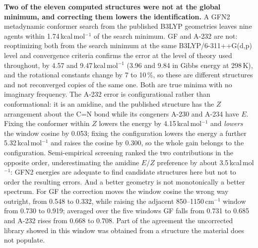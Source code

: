 \documentclass[review,12pt]{elsarticle}
\newcommand*\wn{\ensuremath{\text{cm}^{-1}}}
\begin{document}
\textbf{Two of the eleven computed structures were not at the global minimum, and
correcting them lowers the identification.} A GFN2 metadynamic conformer search from the
published B3LYP geometries leaves nine agents within 1.74\,kcal\,mol$^{-1}$ of the search
minimum. GF and A-232 are not: reoptimizing both from the search minimum at the same
B3LYP/6-311++G(d,p) level and convergence criteria confirms the error at the level of
theory used throughout, by 4.57 and 9.47\,kcal\,mol$^{-1}$ (3.96 and 9.84 in Gibbs energy at 298\,K), and the rotational constants
change by 7 to 10\,\%, so these are different structures and not reconverged copies of the
same one. Both are true minima with no imaginary frequency. The A-232 error is
configurational rather than conformational: it is an amidine, and the published structure
has the $Z$ arrangement about the C=N bond while its congeners A-230 and A-234 have $E$.
Fixing the conformer within $Z$ lowers the energy by 4.15\,kcal\,mol$^{-1}$ and
\emph{lowers} the window cosine by 0.053; fixing the configuration lowers the energy a
further 5.32\,kcal\,mol$^{-1}$ and raises the cosine by 0.300, so the whole gain belongs to
the configuration. Semi-empirical screening ranked the two contributions in the opposite
order, underestimating the amidine $E/Z$ preference by about 3.5\,kcal\,mol$^{-1}$: GFN2
energies are adequate to find candidate structures here but not to order the resulting
errors. And a better geometry is not monotonically a better spectrum. For GF the correction
moves the window cosine the wrong way outright, from 0.548 to 0.332, while raising the
adjacent 850--1150\,\wn{} window from 0.730 to 0.919; averaged over the five windows GF
falls from 0.731 to 0.685 and A-232 rises from 0.668 to 0.708. Part of the agreement the
uncorrected library showed in this window was obtained from a structure the material does
not populate.
\end{document}
